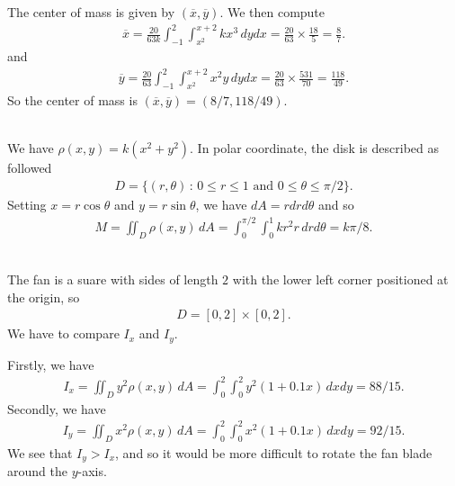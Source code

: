 	The center of mass is given by $(\overline{x} , \overline{y})$. We then compute
		\begin{align*}
		\overline{x} = \frac{20}{63k} \int_{-1}^2 \int_{x^2}^{x + 2} k x^3 \, dy dx = \frac{20}{63} \times \frac{18}{5} = \frac{8}{7} .
		\end{align*}
	and
		\begin{align*}
		\overline{y} = \frac{20}{63} \int_{-1}^2 \int_{x^2}^{x + 2} x^2 y \, dy dx =  \frac{20}{63} \times \frac{531}{70} = \frac{118}{49} .
		\end{align*}
	So the center of mass is $(\overline{x}, \overline{y}) = (8/7 , 118/49 )$. 

	\spc
	
	\\
	We have $\rho (x, y) = k (x^2 + y^2 )$. In polar coordinate, the disk is described as followed
		\begin{align*}
		D = \{ (r, \theta ) \, : \, 0 \leq r \leq 1 \text{ and } 0 \leq \theta \leq \pi/2 \} .
		\end{align*}
	Setting $x = r\cos \theta$ and $y = r \sin \theta$, we have $dA = r dr d\theta$ and so
		\begin{align*}
		M = \iint_D \rho (x, y ) \, dA = \int_0^{\pi/2} \int_0^1 k r^2 r \, dr d\theta = k \pi / 8 .
		\end{align*}
	
	\spc
	
	\\
	The fan is a suare with sides of length $2$ with the lower left corner positioned at the origin, so
		\begin{align*}
		D = [0, 2] \times [0, 2] .
		\end{align*}
	We have to compare $I_x$ and $I_y$.
	
	Firstly, we have
		\begin{align*}
		I_x = \iint_D y^2 \rho (x, y) \, dA = \int_0^2 \int_0^2 y^2 (1 + 0.1 x) \, dx dy = 88/15 .
		\end{align*}
	Secondly, we have
		\begin{align*}
		I_y = \iint_D x^2 \rho (x, y) \, dA = \int_0^2 \int_0^2 x^2 (1 + 0.1 x) \, dx dy = 92/15 .
		\end{align*}
	We see that $I_y > I_x$, and so it would be more difficult to rotate the fan blade around the $y$-axis.


